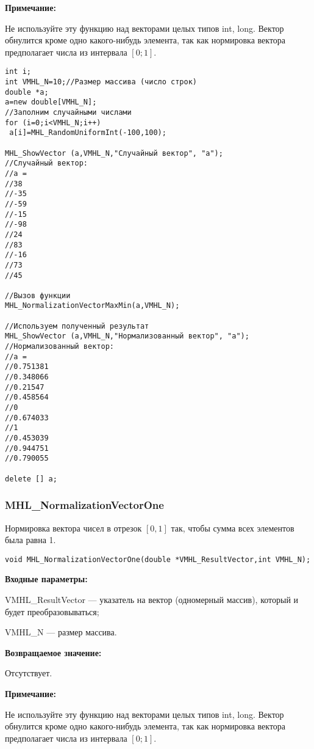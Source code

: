 \documentclass[a4paper,12pt]{article}
\begin{document}
\textbf{Примечание:} 

Не используйте эту функцию над векторами целых типов int, long. Вектор обнулится кроме одно какого-нибудь элемента, так как нормировка вектора предполагает числа из интервала $[0;1]$.


\begin{lstlisting}[label=code_use_MHL_NormalizationVectorMaxMin,caption=Пример использования]
int i;
int VMHL_N=10;//Размер массива (число строк)
double *a;
a=new double[VMHL_N];
//Заполним случайными числами
for (i=0;i<VMHL_N;i++)
 a[i]=MHL_RandomUniformInt(-100,100);

MHL_ShowVector (a,VMHL_N,"Случайный вектор", "a");
//Случайный вектор:
//a =
//38
//-35
//-59
//-15
//-98
//24
//83
//-16
//73
//45

//Вызов функции
MHL_NormalizationVectorMaxMin(a,VMHL_N);

//Используем полученный результат
MHL_ShowVector (a,VMHL_N,"Нормализованный вектор", "a");
//Нормализованный вектор:
//a =
//0.751381
//0.348066
//0.21547
//0.458564
//0
//0.674033
//1
//0.453039
//0.944751
//0.790055

delete [] a;
\end{lstlisting}

\subsubsection{MHL\_NormalizationVectorOne}\label{MHL_NormalizationVectorOne}

Нормировка вектора чисел в отрезок $[0,1]$ так, чтобы сумма всех элементов была равна 1.


\begin{lstlisting}[label=code_syntax_MHL_NormalizationVectorOne,caption=Синтаксис]
void MHL_NormalizationVectorOne(double *VMHL_ResultVector,int VMHL_N);
\end{lstlisting}

\textbf{Входные параметры:}

 VMHL\_ResultVector --- указатель на вектор (одномерный массив), который и будет преобразовываться;
 
 VMHL\_N --- размер массива.

\textbf{Возвращаемое значение:} 
 
Отсутствует.

\textbf{Примечание:} 

Не используйте эту функцию над векторами целых типов int, long. Вектор обнулится кроме одно какого-нибудь элемента, так как нормировка вектора предполагает числа из интервала $[0;1]$.
\end{document}
